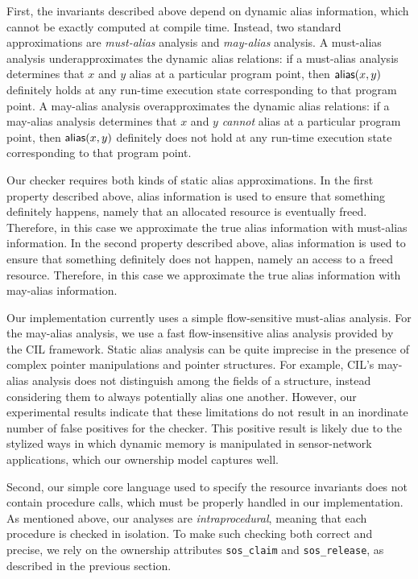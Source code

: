 First, the invariants described above depend on dynamic alias
information, which cannot be exactly computed at compile time.
Instead, two standard approximations are {\em must-alias} analysis and
{\em may-alias} analysis.
A must-alias analysis underapproximates the
dynamic alias relations:  if a must-alias analysis determines that $x$
and $y$ alias at a particular program point, then
${\mathsf{alias}}(x,y)$ definitely holds at any run-time
execution state corresponding to that program point.
A may-alias analysis overapproximates the
dynamic alias relations:  if a may-alias analysis determines that $x$
and $y$ {\em cannot} alias at a particular program point, then
${\mathsf{alias}}(x,y)$ definitely does not hold at any run-time
execution state corresponding to that program point.

Our checker requires both kinds of static alias approximations.  In
the first property described above, alias information is
used to ensure that something definitely happens, namely that an
allocated resource is eventually freed.  Therefore, in this case we
approximate the true alias information with must-alias information.
In the second property described above, alias information is used to
ensure that something definitely does not happen, namely an access to
a freed resource.  Therefore, in this case we approximate the true
alias information with may-alias information.

Our implementation currently uses a simple flow-sensitive 
must-alias analysis.  For the may-alias analysis, we
use a fast flow-insensitive alias analysis provided by the CIL
framework.  Static alias analysis can be quite imprecise in the
presence of complex pointer manipulations and pointer structures.  For
example, CIL's may-alias analysis does not distinguish among the
fields of a structure, instead considering them to always potentially
alias one another.  However,
our experimental results indicate that
these limitations do not result in an inordinate number of false
positives for the checker.
This positive result is likely due to
the stylized ways in which dynamic memory is
manipulated in sensor-network applications, which our ownership model
captures well.  

Second, our simple core language used to specify the resource
invariants does not contain procedure calls, which must be properly
handled in our implementation.  As mentioned above, our analyses are
{\em intraprocedural}, meaning that each procedure is checked in
isolation.  To make such checking both correct and precise, we rely on
the ownership attributes {\tt sos\_claim} and {\tt sos\_release}, as
described in the previous section.

